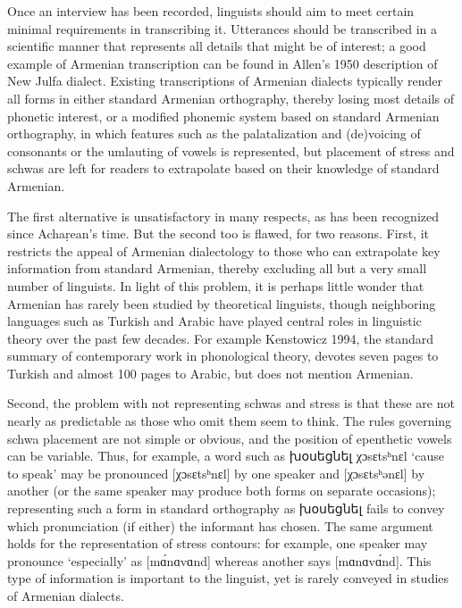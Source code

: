 \begin{exe}
Once an interview has been recorded, linguists should aim to meet certain minimal requirements in transcribing it. Utterances should be transcribed in a scientific manner that represents all details that might be of interest; a good example of Armenian transcription can be found in Allen’s 1950 description of New Julfa dialect. Existing transcriptions of Armenian dialects typically render all forms in either standard Armenian orthography, thereby losing most details of phonetic interest, or a modified phonemic system based on standard Armenian orthography, in which features such as the palatalization and (de)voicing of consonants or the umlauting of vowels is represented, but placement of stress and schwas are left for readers to extrapolate based on their knowledge of standard Armenian. 

The first alternative is unsatisfactory in many respects, as has been recognized since Achaṛean’s time. But the second too is flawed, for two reasons. First, it restricts the appeal of Armenian dialectology to those who can extrapolate key information from standard Armenian, thereby excluding all but a very small number of linguists. In light of this problem, it is perhaps little wonder that Armenian has rarely been studied by theoretical linguists, though neighboring languages such as Turkish and Arabic have played central roles in linguistic theory over the past few decades. For example Kenstowicz 1994, the standard summary of contemporary work in phonological theory, devotes seven pages to Turkish and almost 100 pages to Arabic, but does not mention Armenian. 

Second, the problem with not representing schwas and stress is that these are not nearly as predictable as those who omit them seem to think. The rules governing schwa placement are not simple or obvious, and the position of epenthetic vowels can be variable. Thus, for example, a word such as խօսեցնել χɔsɛtsʰnɛl ‘cause to speak’ may be pronounced [χɔsɛtsʰnɛl] by one speaker and [χɔsɛtsʰənɛl] by another (or the same speaker may produce both forms on separate occasions); representing such a form in standard orthography as խօսեցնել fails to convey which pronunciation (if either) the informant has chosen. The same argument holds for the representation of stress contours: for example, one speaker may pronounce ‘especially’ as [mɑ́nɑvɑnd] whereas another says [mɑnɑvɑ́nd]. This type of information is important to the linguist, yet is rarely conveyed in studies of Armenian dialects.


\end{exe}

